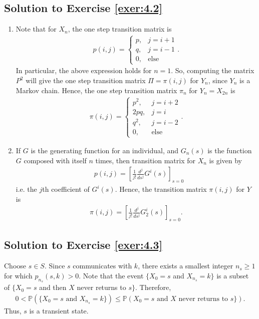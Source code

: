 \documentclass[12pt]{book}
\numberwithin{equation}{chapter}
\theoremstyle{plain}
\numberwithin{theorem}{section}
\theoremstyle{definition}
\numberwithin{exercise}{chapter}
\newcommand{\<}{\langle}
\renewcommand{\>}{\rangle}
\renewcommand{\(}{\left(}
\renewcommand{\)}{\right)}
\renewcommand{\[}{\left[}
\renewcommand{\]}{\right]}
\newcommand\Pb{\mathds{P}}
\begin{document}
\subsection*{Solution to Exercise \ref{exer:4.2}}
\begin{enumerate}
	\item[(a.)] Note that for $X_n$, the one step transition matrix is
	\begin{align}
	p(i,j)
		= \left\{
		\begin{array}{lr}
		p,& j = i+1\\
		q,& j = i-1\\
		0,& \text{else}
		\end{array}
		\right. .
	\end{align}
	In particular, the above expression holds for $n= 1$. So, computing the matrix $P^2$ will give the one 
step transition matrix $\Pi = \pi(i,j)$ for $Y_n$, since $Y_n$ is a Markov chain. Hence, the one step transition matrix 
$\pi_n$ for $Y_n = X_{2n}$ is 
\begin{align}
\pi(i,j)
	= \left\{ 
	\begin{array}{lr}
	p^2, & j = i+2 \\
	2pq, & j = i \\
	q^2, & j = i-2 \\
	0,& \text{else}
	\end{array}
	\right. .
\end{align}
	\item[(b.)] If $G$ is the generating function for an individual, and $G_n(s)$ is the function $G$ composed with 
itself $n$ times, then transition matrix for $X_n$ is given by
	\begin{align}
	&p(i,j)
		= \[\frac{1}{j!} \frac{d^j}{ds^j} G^i(s)\]_{s=0}
	\end{align}
	i.e. the $j$th coefficient of $G^{i}(s)$. Hence, the transition matrix $\pi(i,j)$ for $Y$ is 
	\begin{align}
	\pi(i,j)
		= \[\frac{1}{j!} \frac{d^j}{ds^j} G_2^i(s)\]_{s=0}.
	\end{align}
\end{enumerate}

\subsection*{Solution to Exercise \ref{exer:4.3}}
Choose $s \in S$. Since $s$ communicates with $k$, there exists a smallest integer $n_s \geq 1$ for which $p_{n_s}(s,k) 
>0$. Note that the event  $\{ X_0 =s $ and $X_{n_s} = k\}$ is a subset of $\{X_0 =s$ and then $X$ never returns to 
$s\}$. Therefore, 
\begin{align}
0 < 
	\Pb( \{X_0 =s \text{ and } X_{n_s} = k \}) 
	\leq \Pb( X_0 = s \text{ and } X \text{ never returns to } s\} ).
\end{align}
Thus, $s$ is a transient state. 
\end{document}
